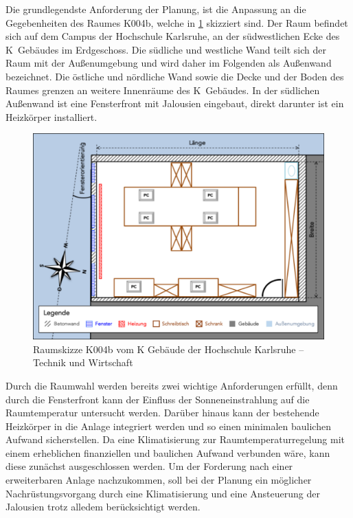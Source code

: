 Die grundlegendste Anforderung der Planung, ist die Anpassung an die Gegebenheiten des Raumes K004b, welche in \ref{fig:skizzek004a} skizziert sind. Der Raum befindet sich auf dem Campus der Hochschule Karlsruhe, an der südwestlichen Ecke des K~Gebäudes im Erdgeschoss. Die südliche und westliche Wand teilt sich der Raum mit der Außenumgebung und wird daher im Folgenden als Außenwand bezeichnet. Die östliche und nördliche Wand sowie die Decke und der Boden des Raumes grenzen an weitere Innenräume des K~Gebäudes. In der südlichen Außenwand ist eine Fensterfront mit Jalousien eingebaut, direkt darunter ist ein Heizkörper installiert.

\begin{figure}
\centering
\includegraphics[width=\textwidth]{abbildungen/20160102_k004a}
\caption[Raumskizze K004b vom K Gebäude der Hochschule Karlsruhe -- Technik und Wirtschaft]{Raumskizze K004b vom K Gebäude der Hochschule Karlsruhe -- Technik und Wirtschaft}
\label{fig:skizzek004a}
\end{figure}

Durch die Raumwahl werden bereits zwei wichtige Anforderungen erfüllt, denn durch die Fensterfront kann der Einfluss der Sonneneinstrahlung auf die Raumtemperatur untersucht werden. Darüber hinaus kann der bestehende Heizkörper in die Anlage integriert werden und so einen minimalen baulichen Aufwand sicherstellen. Da eine Klimatisierung zur Raumtemperaturregelung mit einem erheblichen finanziellen und baulichen Aufwand verbunden wäre, kann diese zunächst ausgeschlossen werden. Um der Forderung nach einer erweiterbaren Anlage nachzukommen, soll bei der Planung ein möglicher Nachrüstungsvorgang durch eine Klimatisierung und eine Ansteuerung der Jalousien trotz alledem berücksichtigt werden.

